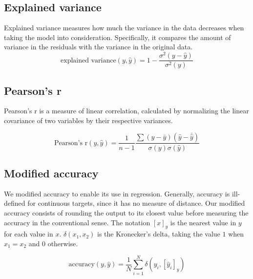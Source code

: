     \subsection{Explained variance}
        Explained variance measures how much the variance in the data decreases when taking the model into consideration. Specifically, it compares the amount of variance in the residuals with the variance in the original data. 
        $$ \text{explained variance}(y, \hat{y}) = 1 - \frac{\sigma^2(y - \hat{y})}{\sigma^2(y)}$$
    
    \subsection{Pearson's r}
        Pearson's r is a measure of linear correlation, calculated by normalizing the linear covariance of two variables by their respective variances. 
        
        $$
        \text{Pearson's r}(y, \hat{y}) = 
        \frac{1}{n-1}\frac{\sum{(y - \bar{y})(\hat{y} - \bar{\hat{y}})}}
             {\sigma(y)\sigma{(\hat{y})}}
        $$
        
        
    
    \subsection{Modified accuracy}
        We modified accuracy to enable its use in regression. Generally, accuracy is ill-defined for continuous targets, since it has no measure of distance. Our modified accuracy consists of rounding the output to its closest value before measuring the accuracy in the conventional sense. The notation $[x]_y$ is the nearest value in $y$ for each value in $x$. $\delta(x_1, x_2)$ is the Kronecker's delta, taking the value $1$ when $x_1 = x_2$ and $0$ otherwise. 
        
        $$
        \text{accuracy}(y, \hat{y}) = \frac{1}{N}\sum_{i=1}^{N}{\delta(y_i, [\hat{y}_i]_y)}
        $$
        
        
        
        
        